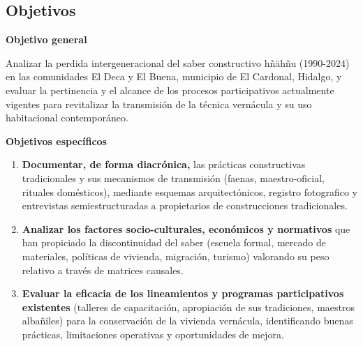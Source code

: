 \subsection{Objetivos}

\textbf{Objetivo general}

Analizar la perdida intergeneracional del saber constructivo hñähñu (1990-2024) en las comunidades El Deca y El Buena, municipio de El Cardonal, Hidalgo, y evaluar la pertinencia y el alcance de los procesos participativos actualmente vigentes para revitalizar la transmisión de la técnica vernácula y su uso habitacional contemporáneo.

\vspace{1em}
\textbf{Objetivos específicos}

\begin{enumerate}
	\item \textbf{Documentar, de forma diacrónica,} las prácticas constructivas tradicionales y sus mecanismos de transmisión (faenas, maestro-oficial, rituales domésticos), mediante esquemas arquitectónicos, registro fotografico y entrevistas semiestructuradas a propietarios de construcciones tradicionales.

	\item \textbf{Analizar los factores socio-culturales, económicos y normativos} que han propiciado la discontinuidad del saber (escuela formal, mercado de materiales, políticas de vivienda, migración, turismo) valorando su peso relativo a través de matrices causales.

	\item \textbf{Evaluar la eficacia de los lineamientos y programas participativos existentes} (talleres de capacitación, apropiación de sus tradiciones, maestros albañiles) para la conservación de la vivienda vernácula, identificando buenas prácticas, limitaciones operativas y oportunidades de mejora.
\end{enumerate}
